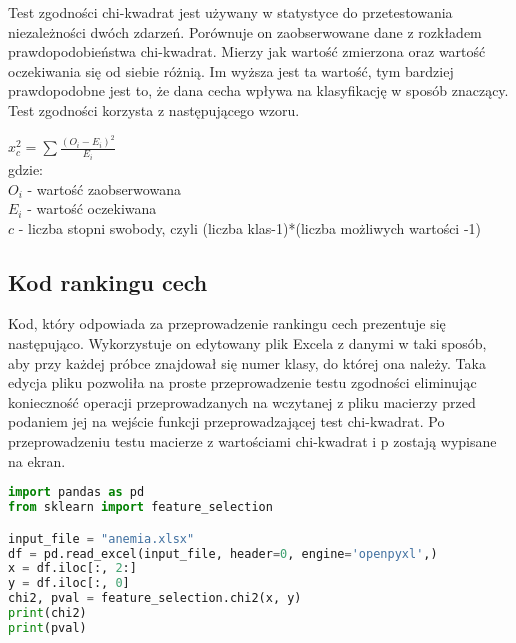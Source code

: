 \documentclass[runningheads]{llncs}
\begin{document}
Test zgodności chi-kwadrat jest używany w statystyce do przetestowania niezależności dwóch zdarzeń. Porównuje on zaobserwowane dane z rozkładem prawdopodobieństwa chi-kwadrat. Mierzy jak wartość zmierzona oraz wartość oczekiwania się od siebie różnią. Im wyższa jest ta wartość, tym bardziej prawdopodobne jest to, że dana cecha wpływa na klasyfikację w sposób znaczący. Test zgodności korzysta z następującego wzoru.\\
\begin{center}
    $ x^2_c=\sum\frac{(O_i-E_i)^2}{E_i} $\\
    \newline
    gdzie:\\
    
    $O_i$ - wartość zaobserwowana\\
    $E_i$ - wartość oczekiwana\\
    $c$ - liczba stopni swobody, czyli (liczba klas-1)*(liczba możliwych wartości -1)\\
\end{center}
\subsection{Kod rankingu cech}
Kod, który odpowiada za przeprowadzenie rankingu cech prezentuje się następująco. Wykorzystuje on edytowany plik Excela z danymi w taki sposób, aby przy każdej próbce znajdował się numer klasy, do której ona należy. Taka edycja pliku pozwoliła na proste przeprowadzenie testu zgodności eliminując konieczność operacji przeprowadzanych na wczytanej z pliku macierzy przed podaniem jej na wejście funkcji przeprowadzającej test chi-kwadrat. Po przeprowadzeniu testu macierze z wartościami chi-kwadrat i p zostają wypisane na ekran.

\begin{lstlisting}[language=Python]
import pandas as pd
from sklearn import feature_selection

input_file = "anemia.xlsx"
df = pd.read_excel(input_file, header=0, engine='openpyxl',)
x = df.iloc[:, 2:]
y = df.iloc[:, 0]
chi2, pval = feature_selection.chi2(x, y)
print(chi2)
print(pval)
\end{lstlisting}
\end{document}
